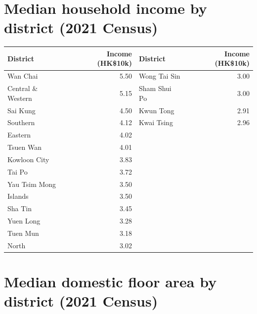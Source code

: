 \documentclass[11pt,a4paper]{article}
\begin{document}
\appendix

\section{Median household income by district (2021 Census)}
\label{app:income}

\begin{table}[H]
\centering
\small
\begin{tabular}{@{}lr@{\hspace{2em}}lr@{}}
\toprule
District & Income (HK\$10k) & District & Income (HK\$10k) \\
\midrule
Wan Chai & 5.50 & Wong Tai Sin & 3.00 \\
Central \& Western & 5.15 & Sham Shui Po & 3.00 \\
Sai Kung & 4.50 & Kwun Tong & 2.91 \\
Southern & 4.12 & Kwai Tsing & 2.96 \\
Eastern & 4.02 & \\
Tsuen Wan & 4.01 & \\
Kowloon City & 3.83 & \\
Tai Po & 3.72 & \\
Yau Tsim Mong & 3.50 & \\
Islands & 3.50 & \\
Sha Tin & 3.45 & \\
Yuen Long & 3.28 & \\
Tuen Mun & 3.18 & \\
North & 3.02 & \\
\bottomrule
\end{tabular}
\end{table}

\section{Median domestic floor area by district (2021 Census)}
\label{app:floor}
\end{document}
